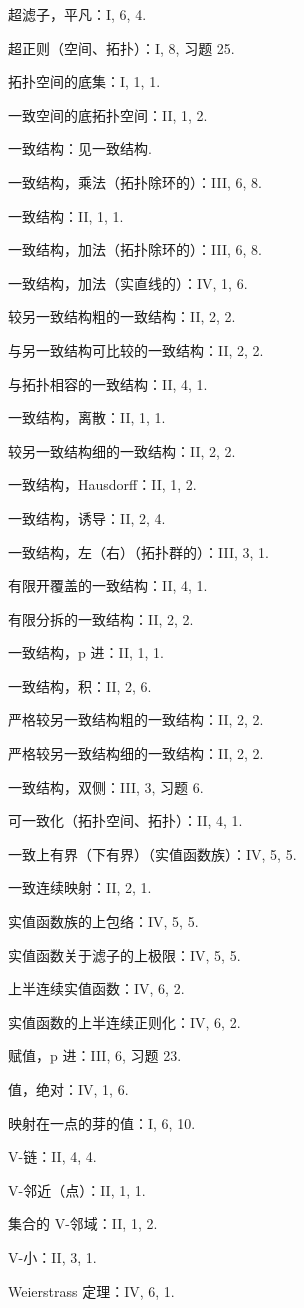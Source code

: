 超滤子，平凡：I, 6, 4.

超正则（空间、拓扑）：I, 8, 习题 25.

拓扑空间的底集：I, 1, 1.

一致空间的底拓扑空间：II, 1, 2.

一致结构：见一致结构.

一致结构，乘法（拓扑除环的）：III, 6, 8.

一致结构：II, 1, 1.

一致结构，加法（拓扑除环的）：III, 6, 8.

一致结构，加法（实直线的）：IV, 1, 6.

较另一致结构粗的一致结构：II, 2, 2.

与另一致结构可比较的一致结构：II, 2, 2.

与拓扑相容的一致结构：II, 4, 1.

一致结构，离散：II, 1, 1.

较另一致结构细的一致结构：II, 2, 2.

一致结构，Hausdorff：II, 1, 2.

一致结构，诱导：II, 2, 4.

一致结构，左（右）（拓扑群的）：III, 3, 1.

有限开覆盖的一致结构：II, 4, 1.

有限分拆的一致结构：II, 2, 2.

一致结构，p 进：II, 1, 1.

一致结构，积：II, 2, 6.

严格较另一致结构粗的一致结构：II, 2, 2.

严格较另一致结构细的一致结构：II, 2, 2.

一致结构，双侧：III, 3, 习题 6.

可一致化（拓扑空间、拓扑）：II, 4, 1.

一致上有界（下有界）（实值函数族）：IV, 5, 5.

一致连续映射：II, 2, 1.

实值函数族的上包络：IV, 5, 5.

实值函数关于滤子的上极限：IV, 5, 5.

上半连续实值函数：IV, 6, 2.

实值函数的上半连续正则化：IV, 6, 2.

赋值，p 进：III, 6, 习题 23.

值，绝对：IV, 1, 6.

映射在一点的芽的值：I, 6, 10.

V-链：II, 4, 4.

V-邻近（点）：II, 1, 1.

集合的 V-邻域：II, 1, 2.

V-小：II, 3, 1.

Weierstrass 定理：IV, 6, 1.
